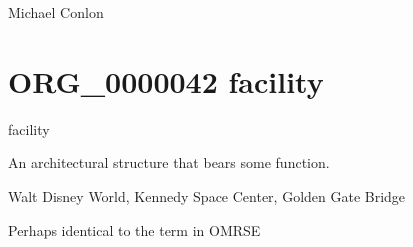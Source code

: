 \documentclass[letterpaper,10pt,english]{sphinxmanual}
\begin{document}
\begin{sphinxShadowBox}

\sphinxAtStartPar
Michael Conlon 
\end{sphinxShadowBox}
\begin{quote}
\label{\detokenize{doc-ORG_0000042:org-0000042}}\label{\detokenize{doc-ORG_0000042:facility}}\label{\detokenize{doc-ORG_0000042:org-0000042}}
\ignorespaces \end{quote}


\section{ORG\_0000042 \sphinxhyphen{} facility}
\label{\detokenize{doc-ORG_0000042:org-0000042-facility}}\label{\detokenize{doc-ORG_0000042:index-0}}\label{\detokenize{doc-ORG_0000042::doc}}
\begin{sphinxShadowBox}

\sphinxAtStartPar
facility
\end{sphinxShadowBox}

\begin{sphinxShadowBox}

\sphinxAtStartPar
An architectural structure that bears some function.
\end{sphinxShadowBox}

\begin{sphinxShadowBox}

\sphinxAtStartPar
{}
\end{sphinxShadowBox}

\begin{sphinxShadowBox}

\sphinxAtStartPar
Walt Disney World, Kennedy Space Center, Golden Gate Bridge
\end{sphinxShadowBox}

\begin{sphinxShadowBox}

\sphinxAtStartPar
Perhaps identical to the term in OMRSE
\end{sphinxShadowBox}
\end{document}
